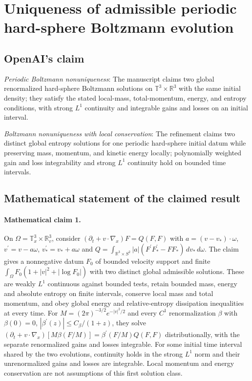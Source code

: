 \documentclass[11pt]{article}
\begin{document}
\section*{Uniqueness of admissible periodic hard-sphere Boltzmann evolution}

\subsection{OpenAI's claim}
\textit{Periodic Boltzmann nonuniqueness}: The manuscript claims two global renormalized hard-sphere Boltzmann solutions on $\mathbb T^3\times\mathbb R^3$ with the same initial density; they satisfy the stated local-mass, total-momentum, energy, and entropy conditions, with strong $L^1$ continuity and integrable gains and losses on an initial interval.

\textit{Boltzmann nonuniqueness with local conservation}: The refinement claims two distinct global entropy solutions for one periodic hard-sphere initial datum while preserving mass, momentum, and kinetic energy locally; polynomially weighted gain and loss integrability and strong $L^1$ continuity hold on bounded time intervals.

\subsection{Mathematical statement of the claimed result}
\paragraph{Mathematical claim 1.} On $\Omega=\mathbb T^3_x\times\mathbb R^3_v$, consider $(\partial_t+v\cdot\nabla_x)F=Q(F,F)$ with $a=(v-v_*)\cdot\omega$, $v^\prime=v-a\omega$, $v_*^\prime=v_*+a\omega$ and $Q=\int_{\mathbb R^3\times S^2}|a|(F^\prime F_*^\prime-FF_*)\,dv_*\,d\omega$. The claim gives a nonnegative datum $F_0$ of bounded velocity support and finite $\int_\Omega F_0(1+|v|^2+|\log F_0|)$ with two distinct global admissible solutions. These are weakly $L^1$ continuous against bounded tests, retain bounded mass, energy and absolute entropy on finite intervals, conserve local mass and total momentum, and obey global energy and relative-entropy dissipation inequalities at every time. For $M=(2\pi)^{-3/2}e^{-|v|^2/2}$ and every $C^1$ renormalization $\beta$ with $\beta(0)=0$, $|\beta^\prime(z)|\le C_\beta/(1+z)$, they solve $(\partial_t+v\cdot\nabla_x)[M\beta(F/M)]=\beta^\prime(F/M)Q(F,F)$ distributionally, with the separate renormalized gains and losses integrable. For some initial time interval shared by the two evolutions, continuity holds in the strong $L^1$ norm and their unrenormalized gains and losses are integrable. Local momentum and energy conservation are not assumptions of this first solution class.
\end{document}
